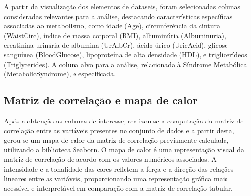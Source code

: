 \documentclass[12pt, a4paper]{article}
\begin{document}
A partir da visualização dos elementos de datasets, foram selecionadas colunas consideradas relevantes para a análise, destacando características específicas associadas ao metabolismo, como idade (Age), circunferência da cintura (WaistCirc), índice de massa corporal (BMI), albuminúria (Albuminuria), creatinina urinária de albumina (UrAlbCr), ácido úrico (UricAcid), glicose sanguínea (BloodGlucose), lipoproteína de alta densidade (HDL), e triglicerídeos (Triglycerides). A coluna alvo para a análise, relacionada à Síndrome Metabólica (MetabolicSyndrome), é especificada. \\

\subsection{Matriz de correlação e mapa de calor}
\par
Após a obtenção as colunas de interesse, realizou-se a computação  da matriz de correlação entre as variáveis presentes no conjunto de dados e a partir desta, gerou-se um mapa de calor da matriz de correlação previamente calculada, utilizando a biblioteca Seaborn. O mapa de calor é uma representação visual da matriz de correlação de acordo com os valores numéricos associados. A intensidade e a tonalidade das cores refletem a força e a direção das relações lineares entre as variáveis, proporcionando uma representação gráfica mais acessível e interpretável em comparação com a matriz de correlação tabular. 
\end{document}
